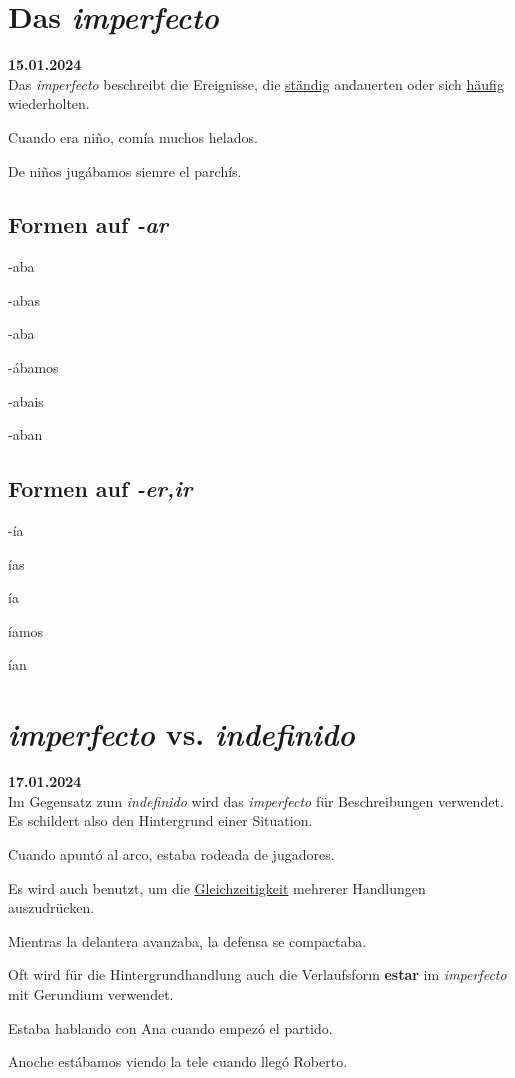 \section{Das \textit{imperfecto}}
\textbf{15.01.2024}\\
Das \textit{imperfecto} beschreibt die Ereignisse, die 
\underline{ständig} andauerten oder sich \underline{häufig}
wiederholten.
\begin{ejemplos}
    \item Cuando era ni\~no, com\'ia muchos helados.
    \item De ni\~nos jug\'abamos siemre el parch\'is.
\end{ejemplos}
\subsection*{Formen auf \textit{-ar}}
\begin{gramatica}
    \item -aba
    \item -abas
    \item -aba
    \item -\'abamos 
    \item -abais
    \item -aban
\end{gramatica}
\subsection*{Formen auf \textit{-er,ir}}
\begin{gramatica}
    \item -\'ia
    \item \'ias 
    \item \'ia 
    \item \'iamos 
    \item \'ian
\end{gramatica}
\section{\textit{imperfecto} vs. \textit{indefinido}}
\textbf{17.01.2024}\\
Im Gegensatz zum \textit{indefinido} wird das \textit{imperfecto}
für Beschreibungen verwendet. Es schildert also den Hintergrund einer 
Situation.
\begin{ejemplos}
    \item Cuando apunt\'o al arco, estaba rodeada de jugadores.
\end{ejemplos}
Es wird auch benutzt, um die \underline{Gleichzeitigkeit} mehrerer 
Handlungen auszudrücken.
\begin{ejemplos}
    \item Mientras la delantera avanzaba, la defensa se compactaba.
\end{ejemplos}
Oft wird für die Hintergrundhandlung auch die Verlaufsform \textbf{estar} 
im \textit{imperfecto} mit Gerundium verwendet.
\begin{ejemplos}
    \item Estaba hablando con Ana cuando empez\'o el partido.
    \item Anoche est\'abamos viendo la tele cuando lleg\'o Roberto.
\end{ejemplos}